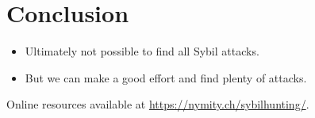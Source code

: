 \section{Conclusion}
\label{sec:conclusion}

\begin{itemize}
	\item Ultimately not possible to find all Sybil attacks.
	\item But we can make a good effort and find plenty of attacks.
\end{itemize}

Online resources available at \url{https://nymity.ch/sybilhunting/}.
